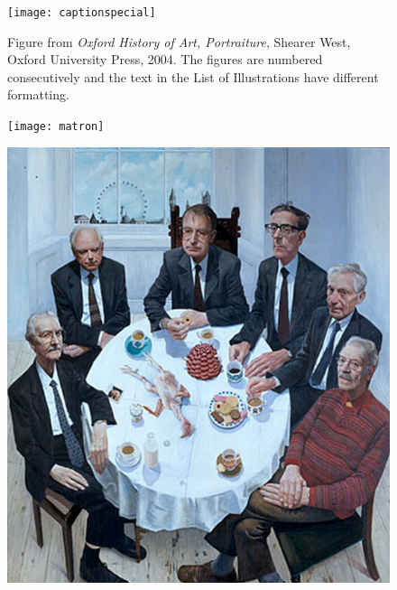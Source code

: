 \def\doubletakeimage{%
  \renewcommand{\topfraction}{.95}  %
  \begin{figure}[t]
    \thispagestyle{caption}
    \texttt{[image: matron]}%
  \end{figure}

  \begin{figure}[tp]
   \hspace*{-\marginparwidth}\includegraphics[height=0.9\textheight]{stuartpearson}
 \end{figure}
}




\lipsum[1-4]
\begin{figure}[htp]
\texttt{[image: captionspecial]}
\centering
\caption{Figure from \textit{Oxford History of Art, Portraiture}, Shearer West, Oxford University Press, 2004. The figures are numbered consecutively and the text in the List of Illustrations have different formatting.}
\end{figure}

\doubletakeimage



\addtocounter{chapter}{-2}

\@toctrue\@specialtrue
